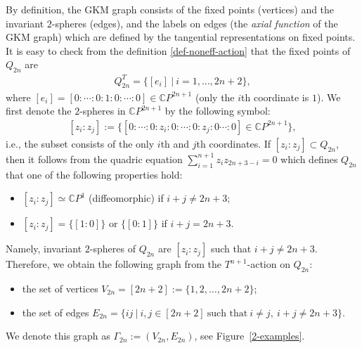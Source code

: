 \documentclass[12pt]{amsart}
\theoremstyle{remark}
\numberwithin{equation}{section}
\begin{document}
By definition, the GKM graph consists of the fixed points (vertices) and the invariant $2$-spheres (edges), and the labels on edges (the {\it axial function} of the GKM graph) which are defined by the tangential representations on fixed points.
It is easy to check from the definition \eqref{def-noneff-action} that  
the fixed points of $Q_{2n}$ are
\begin{align*}
Q_{2n}^{T}=\{[e_{i}]\ |\ i=1,\ldots, 2n+2\},
\end{align*}
where $[e_{i}]=[0:\cdots :0:1:0:\cdots :0]\in \mathbb{C}P^{2n+1}$ (only the $i$th coordinate is $1$).
We first denote the $2$-spheres in $\mathbb{C}P^{2n+1}$ by the following symbol:
\begin{align}
\label{invariant-sphere}
[z_{i}:z_{j}]:=\{[0:\cdots: 0: z_{i}:0: \cdots: 0: z_{j}: 0\cdots: 0 ]\in \mathbb{C}P^{2n+1}\},
\end{align} 
i.e., the subset consists of the only $i$th and $j$th coordinates. 
If $[z_{i}:z_{j}]\subset Q_{2n}$, then it follows from the quadric equation $\sum_{i=1}^{n+1}z_{i}z_{2n+3-i}=0$ which defines $Q_{2n}$ that one of the following properties hold:
\begin{itemize}
\item 
$[z_{i}:z_{j}]\simeq \mathbb{C}P^{1}$ (diffeomorphic) if $i+j\not=2n+3$;
\item
$[z_{i}:z_{j}]=\{[1:0]\}$ or $\{[0:1]\}$ if $i+j=2n+3$.
\end{itemize}
Namely, invariant $2$-spheres of $Q_{2n}$ are $[z_{i}:z_{j}]$ such that $i+j\not=2n+3$.
Therefore, we obtain the following graph from 
the $T^{n+1}$-action on $Q_{2n}$: 
\begin{itemize}
\item the set of vertices $V_{2n}=[2n+2]:=\{1,2,\ldots, 2n+2\}$;
\item the set of edges $E_{2n}=\{ij\ |\ i,j\in [2n+2] \ \text{such that}\ i\not=j,\ i+j\not=2n+3 \}$.
\end{itemize}
We denote this graph as $\Gamma_{2n}:=(V_{2n},E_{2n})$, see Figure~\ref{2-examples}. 
\end{document}
